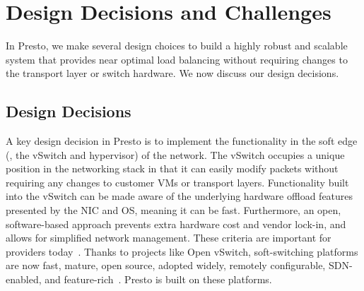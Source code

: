 \section{Design Decisions and Challenges}
\label{sec:background}

In Presto, we make several design choices to 
build a highly robust and scalable system that provides near optimal load 
balancing without requiring changes to the transport layer or switch hardware. We 
now discuss our design decisions.


\subsection{Design Decisions}

 A key design decision in Presto 
is to implement the functionality in the soft edge (\ie, the vSwitch and hypervisor) of 
the network. 
The vSwitch occupies a unique position in the networking stack 
in that it can easily modify packets without requiring any changes to customer VMs or transport layers.
Functionality built into the vSwitch can be made aware of the underlying hardware offload
features presented by the NIC and OS, meaning it can be fast.
Furthermore, an open, software-based approach prevents extra hardware cost and vendor 
lock-in, and allows for simplified network management. 
These criteria are important for providers today~\cite{aws-peek}.
Thanks to projects like Open vSwitch, 
soft-switching platforms are now fast, mature, open source, adopted widely, remotely 
configurable, SDN-enabled, and feature-rich~\cite{ovs-edge,nv-mtd,pfaff2015design}. Presto is built on these 
platforms.

